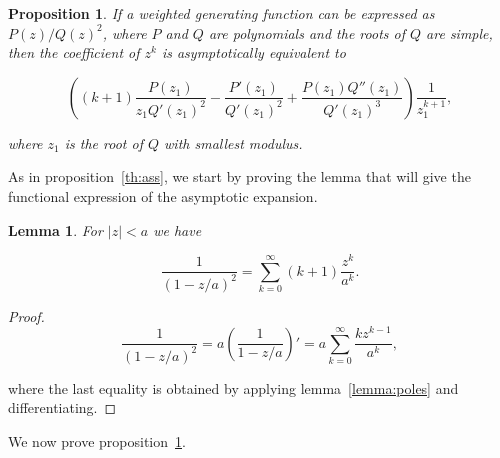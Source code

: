 \documentclass{article}
\newtheorem{lemma}{Lemma}
\newtheorem{proposition}{Proposition}
\begin{document}
\begin{proposition}
\label{th:ass2}
If a weighted generating function can be expressed as $P(z)/Q(z)^2$, where
$P$ and $Q$ are polynomials and the roots of $Q$ are simple, then the
coefficient of $z^k$ is asymptotically equivalent to

\begin{equation}
\label{eq:ass2}
\left( (k+1)\frac{P(z_1)}{z_1 Q'(z_1)^2} - \frac{P'(z_1)}{Q'(z_1)^2} +
\frac{P(z_1)Q''(z_1)}{Q'(z_1)^3} \right)
\frac{1}{z_1^{k+1}},
\end{equation}

\noindent
where $z_1$ is the root of $Q$ with smallest modulus.
\end{proposition}

As in proposition~\ref{th:ass}, we start by proving the lemma that will
give the functional expression of the asymptotic expansion.

\begin{lemma}
\label{lemma:poles2}
For $|z| < a$ we have

\begin{equation}
\label{eq:poles2}
\frac{1}{(1-z/a)^2} = \sum_{k=0}^\infty (k+1)\frac{z^k}{a^k}.
\end{equation}
\end{lemma}

\begin{proof}
\begin{equation*}
\frac{1}{(1-z/a)^2} = a \left( \frac{1}{1-z/a} \right)'
= a \sum_{k=0}^\infty \frac{kz^{k-1}}{a^k},
\end{equation*}

\noindent
where the last equality is obtained by applying lemma~\ref{lemma:poles}
and differentiating.
\end{proof}

We now prove proposition~\ref{th:ass2}.
\end{document}
